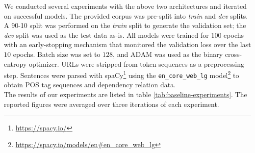 \documentclass[11pt]{article}
\begin{document}
We conducted several experiments with the above two architectures and iterated on successful models. The provided corpus was
pre-split into \emph{train} and \emph{dev} splits. A 90-10 split was performed on the \emph{train} split to generate
the validation set; the \emph{dev} split was used as the test data as-is. All models were trained for $100$ epochs with an
early-stopping mechanism that monitored the validation loss over the last $10$ epochs. Batch size was set to $128$, and ADAM
\cite{kingma2014adam} was used as the binary cross-entropy optimizer. URLs were stripped from token sequences as a preprocessing
step. Sentences were parsed with spaCy\footnote{\url{https://spacy.io/}} using the \texttt{en\_core\_web\_lg} model\footnote{\url{https://spacy.io/models/en#en_core_web_lg}} to obtain POS tag sequences and dependency relation data.\\

The results of our experiments are listed in table \ref{tab:baseline-experiments}. The reported figures were averaged over three iterations of each experiment.
\end{document}
